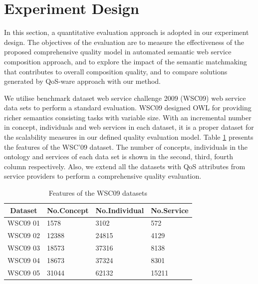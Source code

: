 \documentclass{llncs}
\begin{document}
\section{Experiment Design}\label{experiment_design}
In this section, a quantitative evaluation approach is adopted in our experiment design. The objectives of the evaluation are to measure the effectiveness of the proposed comprehensive quality model in automated semantic web service composition approach, and to explore the impact of the semantic matchmaking that contributes to overall composition quality, and to compare solutions generated by QoS-ware approach with our method.

We utilise benchmark dataset web service challenge 2009 (WSC09) \cite{kona2009wsc} web service data sets to perform a standard evaluation. WSC09 designed OWL for providing richer semantics consisting tasks with variable size. With an incremental number in concept, individuals and web services in each dataset, it is a proper dataset for the scalability measures in our defined quality evaluation model. Table \ref{wsc09datasetTable} presents the features of the WSC’09 dataset. The number of concepts, individuals in the ontology and services of each data set is shown in the second, third, fourth column respectively. Also, we extend all the datasets with QoS attributes from service providers to perform a comprehensive quality evaluation. 
\begin{table}[]
\centering
\caption{Features of the WSC09 datasets}
\label{wsc09datasetTable}
\begin{tabular}{|l|l|l|l|}
\hline
\multicolumn{1}{|c|}{Dataset} & No.Concept & No.Individual & No.Service \\ \hline
WSC09 01                     & 1578       &3102           &572      \\ \hline
WSC09 02                     & 12388      &24815          &4129      \\ \hline
WSC09 03                     & 18573      &37316          &8138      \\ \hline
WSC09 04                     & 18673      &37324          &8301      \\ \hline
WSC09 05                     & 31044      &62132          &15211    \\ \hline
\end{tabular}
\end{table}
\end{document}
